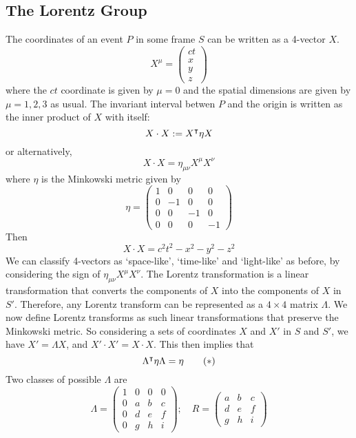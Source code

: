 \subsection{The Lorentz Group}
The coordinates of an event \(P\) in some frame \(S\) can be written as a 4-vector \(X\).
\[ X^\mu = \begin{pmatrix}
		ct \\ x \\ y \\ z
	\end{pmatrix} \]
where the \(ct\) coordinate is given by \(\mu = 0\) and the spatial dimensions are given by \(\mu = 1, 2, 3\) as usual. The invariant interval betwen \(P\) and the origin is written as the inner product of \(X\) with itself:
\[ X \cdot X := X^\intercal \eta X \]
or alternatively,
\[ X \cdot X = \eta_{\mu\nu} X^\mu X^\nu \]
where \(\eta\) is the Minkowski metric given by
\[ \eta = \begin{pmatrix}
		1 & 0  & 0  & 0  \\
		0 & -1 & 0  & 0  \\
		0 & 0  & -1 & 0  \\
		0 & 0  & 0  & -1
	\end{pmatrix} \]
Then
\[ X \cdot X = c^2t^2 - x^2 - y^2 - z^2 \]
We can classify 4-vectors as `space-like', `time-like' and `light-like' as before, by considering the sign of \(\eta_{\mu\nu}X^\mu X^\nu\). The Lorentz transformation is a linear transformation that converts the components of \(X\) into the components of \(X\) in \(S'\). Therefore, any Lorentz transform can be represented as a \(4\times 4\) matrix \(\Lambda\). We now define Lorentz transforms as such linear transformations that preserve the Minkowski metric. So considering a sets of coordinates \(X\) and \(X'\) in \(S\) and \(S'\), we have \(X' = \Lambda X\), and \(X' \cdot X' = X \cdot X\). This then implies that
\begin{equation}
	\Lambda^\intercal \eta \Lambda = \eta \tag{\(\ast\)}
\end{equation}
Two classes of possible \(\Lambda\) are
\[ \Lambda = \begin{pmatrix}
		1 & 0 & 0 & 0 \\
		0 & a & b & c \\
		0 & d & e & f \\
		0 & g & h & i
	\end{pmatrix};\quad R = \begin{pmatrix}
		a & b & c \\
		d & e & f \\
		g & h & i
	\end{pmatrix} \]
